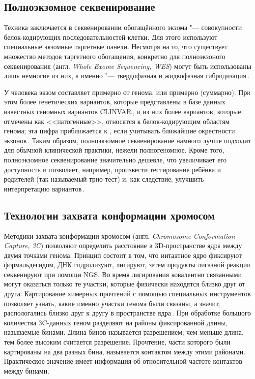 \documentclass[12pt, twoside, a4paper]{article}
\newcommand{\engterm}[1]{англ. \textenglish{\textit{#1}}}
\begin{document}
\subsection*{Полноэкзомное секвенирование}

Техника заключается в секвенировании обогащённого экзома "--- совокупности белок-кодирующих последовательностей клетки.
Для этого используют специальные экзомные таргетные панели.
Несмотря на то, что существует множество методов таргетного обогащения, конкретно для полноэкзоного секвенирования (\engterm{Whole Exome Sequencing, WES}) могут быть использованы лишь немногие из них, а именно "--- твердофазная и жидкофазная гибридизация\,\cite{Teer_2010}.

У человека экзом составляет примерно  от генома, или примерно  (суммарно).
При этом более  генетических вариантов, которые представлены в базе данных известных геномных вариантов CLINVAR\,\cite{Landrum_2017}, и из них более  вариантов, которые отмечены как <<патогенные>>, относятся к белок-кодирующим областям генома;
эта цифра приближается к , если учитывать ближайшие окрестности экзонов\,\cite{Barbitoff_2020}.
Таким образом, полноэкзомное секвенирование намного лучше подходит для обычной клинической практики, нежели полногеномное.
Кроме того, полноэкзомное секвенирование значительно дешевле, что увеличивает его доступность и позволяет, например, произвести тестирование ребёнка и родителей (так называемый трио-тест) и, как следствие, улучшить интерпретацию вариантов\,\cite{Yohe_2017}.

\subsection*{Технологии захвата конформации хромосом}

Методики захвата конформации хромосом (\engterm{Chromosome Conformation Capture, 3C}) позволяют определить расстояние в 3D-пространстве ядра между двумя точками генома.
Принцип состоит в том, что интактное ядро фиксируют формальдегидом, ДНК гидролизуют, лигируют, затем продукты лигазной реакции секвенируют при помощи NGS.
Во время лигирования ковалентно связанными могут оказаться только те участки, которые физически находятся близко друг от друга.
Картирование химерных прочтений с помощью специальных инструментов позволяет узнать, какие именно участки генома были связаны, а значит, распологались близко друг к другу в пространстве ядра\,\cite{Lieberman_Aiden_2009}.
При обработке большого количества 3C-данных геном разделяют на районы фиксированной длины, называемые бинами.
Длина бинов называется разрешением; чем меньше длина, тем более высоким считается разрешение.
Прочтение, части которого были картированы на два разных бина, называется контактом между этими районами.
Практическое значение имеет информация об относительной частоте контактов между бинами.
\end{document}
